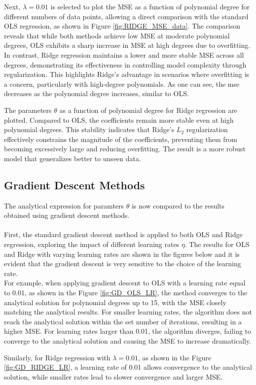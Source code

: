 \documentclass[
 reprint,            %
 amsmath,amssymb,
 aps,
]{revtex4-2}
\begin{document}


Next, $\lambda = 0.01$ is selected to plot the MSE as a function of polynomial degree for different numbers of data points, allowing a direct comparison with the standard OLS regression, as shown in Figure \ref{fig:RIDGE_MSE_data}. 
The comparison reveals that while both methods achieve low MSE at moderate polynomial degrees, OLS exhibits a sharp increase in MSE at high degrees due to overfitting.
In contrast, Ridge regression maintains a lower and more stable MSE across all degrees, demonstrating its effectiveness in controlling model complexity through regularization. This highlights Ridge's advantage in scenarios where overfitting is a concern, particularly with high-degree polynomials.
As one can see, the mse decreases as the polynomial degree increases, similar to OLS.


The parameters $\theta$ as a function of polynomial degree for Ridge regression are plotted.
Compared to OLS, the coefficients remain more stable even at high polynomial degrees. 
This stability indicates that Ridge's $L_2$ regularization effectively constrains the magnitude of the coefficients, preventing them from becoming excessively large and reducing overfitting.
The result is a more robust model that generalizes better to unseen data.

\subsection{Gradient Descent Methods}
\label{Gradient Descent Methods}

The analytical expression for paramters $\theta$ is now compared to the results obtained using gradient descent methods.\\\\
First, the standard gradient descent method is applied to both OLS and Ridge regression, exploring the impact of different learning rates $\eta$. 
The results for OLS and Ridge with varying learning rates are shown in the figures below and it is evident that the gradient descent is very sensitive to the choice of the learning rate.\\
For example, when applying gradient descent to OLS with a learning rate equal to 0.01, as shown in the Figure \ref{fig:GD_OLS_LR}, the method converges to the analytical solution for polynomial degrees up to 15, with the MSE closely matching the analytical results.
For smaller learning rates, the algorithm does not reach the analytical solution within the set number of iterations, resulting in a higher MSE. 
For learning rates larger than 0.01, the algorithm diverges, failing to converge to the analytical solution and causing the MSE to increase dramatically.

Similarly, for Ridge regression with $\lambda = 0.01$, as shown in the Figure \ref{fig:GD_RIDGE_LR}, a learning rate of 0.01 allows convergence to the analytical solution, while smaller rates lead to slower convergence and larger MSE.

 
\end{document}
